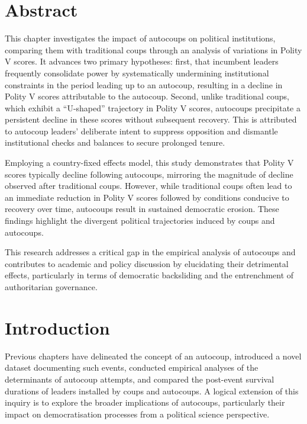 \documentclass[
  12pt,
]{report}
\begin{document}
\section*{Abstract}\label{abstract-4}

This chapter investigates the impact of autocoups on political
institutions, comparing them with traditional coups through an analysis
of variations in Polity V scores. It advances two primary hypotheses:
first, that incumbent leaders frequently consolidate power by
systematically undermining institutional constraints in the period
leading up to an autocoup, resulting in a decline in Polity V scores
attributable to the autocoup. Second, unlike traditional coups, which
exhibit a ``U-shaped'' trajectory in Polity V scores, autocoups
precipitate a persistent decline in these scores without subsequent
recovery. This is attributed to autocoup leaders' deliberate intent to
suppress opposition and dismantle institutional checks and balances to
secure prolonged tenure.

Employing a country-fixed effects model, this study demonstrates that
Polity V scores typically decline following autocoups, mirroring the
magnitude of decline observed after traditional coups. However, while
traditional coups often lead to an immediate reduction in Polity V
scores followed by conditions conducive to recovery over time, autocoups
result in sustained democratic erosion. These findings highlight the
divergent political trajectories induced by coups and autocoups.

This research addresses a critical gap in the empirical analysis of
autocoups and contributes to academic and policy discussion by
elucidating their detrimental effects, particularly in terms of
democratic backsliding and the entrenchment of authoritarian governance.

\newpage

\section{Introduction}\label{introduction-4}

Previous chapters have delineated the concept of an autocoup, introduced
a novel dataset documenting such events, conducted empirical analyses of
the determinants of autocoup attempts, and compared the post-event
survival durations of leaders installed by coups and autocoups. A
logical extension of this inquiry is to explore the broader implications
of autocoups, particularly their impact on democratisation processes
from a political science perspective.
\end{document}
